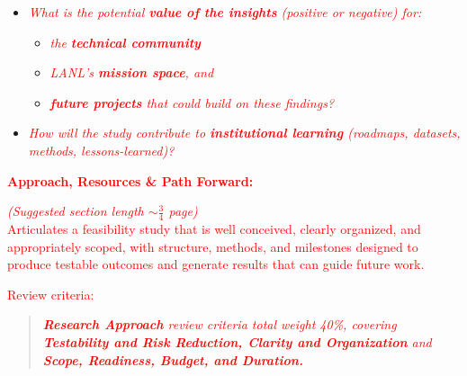 \begin{itemize}[noitemsep,nolistsep]
    \item \textcolor{red}{\textit{What is the potential \textbf{value of the insights} (positive or negative) for:}}
    \begin{itemize}[noitemsep,nolistsep]
        \item \textcolor{red}{\textit{the \textbf{technical community}}}
        \item \textcolor{red}{\textit{LANL's \textbf{mission space}, and}}
        \item \textcolor{red}{\textit{\textbf{future projects} that could build on these findings?}}
    \end{itemize}
    \item \textcolor{red}{\textit{How will the study contribute to \textbf{institutional learning} (roadmaps, datasets, methods, lessons-learned)?}}
\end{itemize}
\vspace*{\baselineskip}

\textcolor{red}{\textbf{Approach, Resources \& Path Forward:}}
\vspace*{0.5\baselineskip}

\textcolor{red}{\textit{(Suggested section length \(\sim \)$\frac{3}{4}$ page)}}\\
\textcolor{red}{Articulates a feasibility study that is well conceived, clearly organized, and appropriately scoped, with structure, methods, and milestones designed to produce testable outcomes and generate results that can guide future work.}
\vspace*{\baselineskip}

\textcolor{red}{Review criteria:}
\begin{quote}
\vspace{-0.4cm}
    \textcolor{red}{\textit{\textbf{Research Approach} review criteria total weight 40\%, covering \textbf{Testability and Risk Reduction, Clarity and Organization} and \textbf{Scope, Readiness, Budget, and Duration.}}}
\end{quote}

